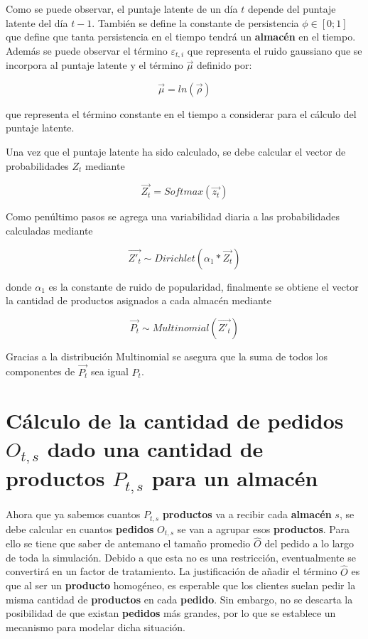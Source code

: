 Como se puede observar, el puntaje latente de un día $t$ depende del puntaje latente del día $t-1$. También se define la constante de persistencia $\phi \in [0;  1]$ que define que tanta persistencia en el tiempo tendrá un \textbf{almacén} en el tiempo. Además se puede observar el término $\varepsilon_{t,i}$ que representa el ruido gaussiano que se incorpora al puntaje latente y el término $\overrightarrow{\mu} $ definido por:

\begin{equation}
    \label{eq:products_by_storage}
    \overrightarrow{\mu}  = ln(\overrightarrow{\rho})
\end{equation}

que representa el término constante en el tiempo a considerar para el cálculo del puntaje latente.

Una vez que el puntaje latente ha sido calculado, se debe calcular el vector de probabilidades $Z_t$ mediante

\begin{equation}
    \label{eq:products_by_storage}
    \overrightarrow{Z_t}  = Softmax(\overrightarrow{z_t})
\end{equation}

Como penúltimo pasos se agrega una variabilidad diaria a las probabilidades calculadas mediante

\begin{equation}
    \label{eq:products_by_storage}
    \overrightarrow{Z'_t} \sim Dirichlet(\alpha_1 * \overrightarrow{ Z_t})
\end{equation}

donde $\alpha_1$ es la constante de ruido de popularidad, finalmente se obtiene el vector la cantidad de productos asignados a cada almacén mediante

\begin{equation}
    \label{eq:products_by_storage}
    \overrightarrow{P_{t}} \sim Multinomial(\overrightarrow{Z'_t})
\end{equation}

Gracias a la distribución Multinomial se asegura que la suma de todos los componentes de $\overrightarrow{P_{t}}$ sea igual $P_t$.


\section{Cálculo de la cantidad de pedidos $O_{t,s}$ dado una cantidad de productos $P_{t,s}$ para un almacén}

Ahora que ya sabemos cuantos $P_{t,s}$ \textbf{productos} va a recibir cada \textbf{almacén} $s$, se debe calcular en cuantos \textbf{pedidos}
$O_{t,s}$ se van a agrupar esos \textbf{productos}. Para ello se tiene que saber de antemano el tamaño promedio $\widehat{O}$ del pedido a lo largo de toda la simulación. Debido a que esta no es una restricción, eventualmente se convertirá en un factor de tratamiento. La justificación de añadir el término $\widehat{O}$ es que al ser un \textbf{producto} homogéneo, es esperable que los clientes suelan pedir la misma cantidad de \textbf{productos} en cada \textbf{pedido}. Sin embargo, no se descarta la posibilidad de que existan \textbf{pedidos} más grandes, por lo que se establece un mecanismo para modelar dicha situación.

